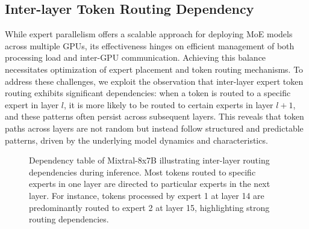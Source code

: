 \noindent{}


\subsection{Inter-layer Token Routing Dependency}

While expert parallelism offers a scalable approach for deploying MoE models across multiple GPUs, its effectiveness hinges on efficient management of both processing load and inter-GPU communication.
%
Achieving this balance necessitates optimization of expert placement and token routing mechanisms.
%
To address these challenges, we exploit the observation that inter-layer expert token routing exhibits significant dependencies: when a token is routed to a specific expert in layer  \( l \), it is more likely to be routed to certain experts in layer \( l+1 \), and these patterns often persist across subsequent layers.
% 
This reveals that token paths across layers are not random but instead follow structured and predictable patterns, driven by the underlying model dynamics and characteristics.
%

\begin{figure}[h!]
    \centering
    
    \vspace{-1.5em}
    \caption{Dependency table of Mixtral-8x7B illustrating inter-layer routing dependencies during inference. Most tokens routed to specific experts in one layer are directed to particular experts in the next layer. For instance, tokens processed by expert 1 at layer 14 are predominantly routed to expert 2 at layer 15, highlighting strong routing dependencies.}
    \label{fig:expert-dependency-table}
    \vspace{-3ex}
\end{figure}

